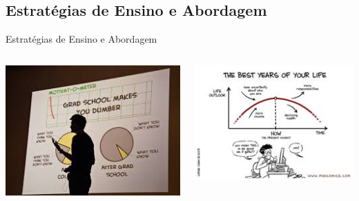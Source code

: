 \documentclass{bredelebeamer}
\begin{document}
\subsection{Estratégias de Ensino e Abordagem}

\begin{frame}{Estratégias de Ensino e Abordagem}

\begin{columns}

\begin{column}{0.5\textwidth}
\includegraphics[scale=0.45]{images/teorica.jpg}
\end{column}

\begin{column}{0.5\textwidth}
\includegraphics[scale=0.5]{images/pratica.jpg}
\end{column}
\end{columns}

\end{frame}
\end{document}
